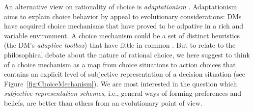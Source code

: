 \documentclass[fleqn,reqno,11pt]{article}
\begin{document}
An alternative view on rationality of choice is \emph{adaptationism}
\citep[e.g.,][]{Anderson1991:Is-human-cognit,ChaterOaksford2000:The-Rational-An,HagenChater2012:Decision-Making}.  Adaptationism aims to explain choice behavior by appeal to evolutionary
considerations: DMs have acquired choice mechanisms that have proved to be adpative in a rich
and variable environment. A choice mechanism could be a set of distinct heuristics (the DM's
\emph{adaptive toolbox}) that have little in common
\citep[e.g.,][]{TverskyKahnemann1981:The-Framing-of-,GigerenzerGoldstein1996:Reasoning-the-F,ScheibehenneRieskamp2013:Testing-the-Ada}. But
to relate to the philosophical debate about the nature of rational choice, we here suggest to
think of a choice mechanism as a map from choice situations to action choices that contains an
explicit level of subjective representation of a decision situation (see
Figure~\ref{fig:ChoiceMechanism}). We are most interested in the question which
\emph{subjective representation schemes}, i.e., general ways of forming preferences and
beliefs, are better than others from an evolutionary point of view.
\end{document}
